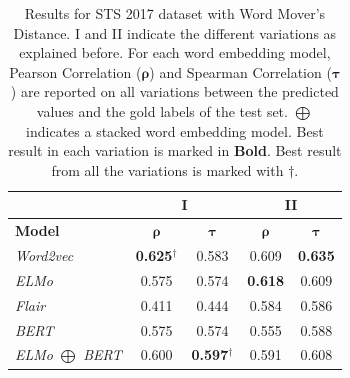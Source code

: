 \begin{enumerate}
\begin{table}[htb]
{\begin{tabular}{|l|cc|cc|}
			\hline & 
			\multicolumn{2}{c|}{\textbf{I}}    & \multicolumn{2}{c|}{\textbf{II}}   \\ 
			\hline
			\multicolumn{1}{|l|}{\textbf{Model}} 
			&  $\bm{\rho}$   & $\bm{\tau}$      
			&  $\bm{\rho}$   & $\bm{\tau}$   
			\\ \hline
			\textit{Word2vec}                     
			& \textbf{0.625}$^{\dagger}$ & 0.583         
			& 0.609             & \textbf{0.635} \\
			\textit{ELMo}                     
			& 0.575                      & 0.574         
			& \textbf{0.618}             & 0.609 \\
			\textit{Flair}                     
			& 0.411                      & 0.444         
			& 0.584                      & 0.586\\
			\textit{BERT}                     
			& 0.575                      & 0.574         
			& 0.555                      & 0.588 \\
			\textit{ELMo $\bigoplus$ BERT}                     
			& 0.600                      & \textbf{0.597}$^{\dagger}$   & 0.591                      & 0.608  \\
			\hline
		\end{tabular}
	}
	\caption[Results for STS 2017 with Word Mover's Distance]{Results for STS 2017 dataset with Word Mover's Distance. I and II indicate the different variations as explained before. For each word embedding model, Pearson Correlation ($\bm{\rho}$) and Spearman Correlation ($\bm{\tau}$) are reported on all variations between the predicted values and the gold labels of the test set. $\bigoplus$ indicates a stacked word embedding model. Best result in each variation is marked in \textbf{Bold}. Best result from all the variations is marked with ${\dagger}$. }  
	\label{tab:sts_word_movers}
\end{table}

\begin{table}[htb]
	\centering
\end{table}
\end{enumerate}
